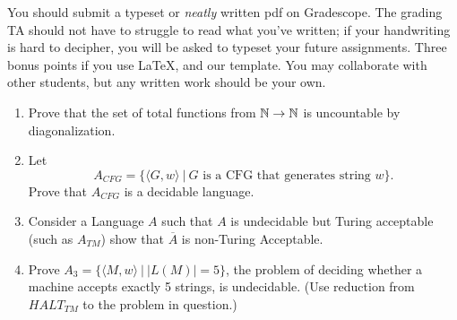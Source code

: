 \documentclass[11pt]{article}
\begin{document}

You should submit a typeset or \emph{neatly} written pdf on Gradescope.  The grading TA should not have to struggle to read what you've written; if your handwriting is hard to decipher, you will be asked to typeset your future assignments. Three bonus points if you use \LaTeX, and our template. You may collaborate with other students, but any written work should be your own.


\begin{enumerate}
    \item Prove that the set of total functions from ${\mathbb N} \rightarrow {\mathbb N}$ is uncountable by diagonalization.

    \item Let $$A_{CFG} = \{\langle G, w\rangle~|~ G \text{ is a CFG that generates string } w\}.$$
    Prove that $A_{CFG}$ is a decidable language.

    \item Consider a Language $A$ such that $A$ is undecidable but Turing acceptable (such as $A_{TM}$) show that $\overline{A}$ is non-Turing Acceptable.

    \item Prove $A_3 = \{\langle M, w\rangle ~|~|L(M)|=5\}$, the problem of deciding whether a machine accepts exactly 5 strings, is undecidable. (Use reduction from $HALT_{TM}$ to the problem in question.)
\end{enumerate}
\end{document}
